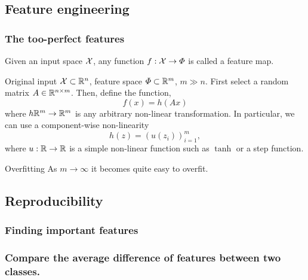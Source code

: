 \subsection{Feature engineering}

\begin{frame}
  \frametitle{The too-perfect features}
  \begin{definition}
    Given an input space ${\mathcal{X}}$, any function $f : {\mathcal{X}} \to \Phi$ is called a feature map.
  \end{definition}

  \begin{example}
    Original input ${\mathcal{X}} \subset {\mathbb{R}}^n$, feature space $\Phi \subset {\mathbb{R}}^m$, $m \gg n$. First select a random matrix $A \in {\mathbb{R}}^{n \times m}$. Then, define the function,
    \[
      f(x) = h(Ax)
    \]
    where $h {\mathbb{R}}^m \to {\mathbb{R}}^m$ is any arbitrary non-linear transformation. In particular, we can use a component-wise non-linearity
    \[
      h(z) = \left(u(z_i)\right)_{i=1}^m,
    \]
    where $u : {\mathbb{R}} \to {\mathbb{R}}$ is a simple non-linear function such as $\tanh$ or a step function. 
  \end{example}
  \begin{alertblock}{Overfitting}
    As $m \to \infty$ it becomes quite easy to overfit.
  \end{alertblock}
\end{frame}

\subsection{Reproducibility}
\begin{frame}
  \frametitle{Finding important features}
\end{frame}

\begin{frame}
  \frametitle{Compare the average difference of features between two classes.}
\end{frame}


